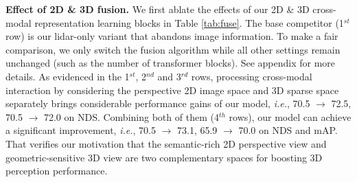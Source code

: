 \documentclass[10pt,twocolumn,letterpaper]{article}
\begin{document}
\noindent \textbf{Effect of 2D \& 3D fusion.} We first ablate the effects of our 2D \& 3D cross-modal representation learning blocks in Table \ref{tab:fuse}. The base competitor (1$^{st}$ row) is our lidar-only variant that abandons image information. To make a fair comparison, we only switch  the fusion algorithm while all other settings remain unchanged (such as the number of transformer blocks). See appendix for more details. As evidenced in the 1$^{st}$, 2$^{nd}$ and 3$^{rd}$ rows, processing cross-modal interaction by considering the perspective 2D image space and 3D sparse space separately brings considerable performance gains of our model, \emph{i.e.}, 70.5 $\rightarrow$ 72.5, 70.5 $\rightarrow$ 72.0 on NDS. Combining both of them (4$^{th}$ rows), our model can achieve a significant improvement, \emph{i.e.}, 70.5 $\rightarrow$ 73.1, 65.9 $\rightarrow$ 70.0 on NDS and mAP. That verifies our motivation that the semantic-rich 2D perspective view and geometric-sensitive 3D view are two complementary spaces for boosting 3D perception performance. 
\end{document}
